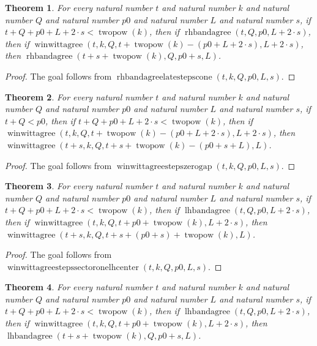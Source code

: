 \documentclass[11pt]{article}
\newtheorem{theorem}{Theorem}[section]
\theoremstyle{definition}
\begin{document}
\begin{theorem}
\label{ll:paper:rhbandagree-late-steps-cone}
For every natural number \(t\) and natural number \(k\) and natural number \(Q\) and natural number \(p0\) and natural number \(L\) and natural number \(s\), if \(t + Q + p0 + L + 2 \cdot s < \operatorname{twopow}(k)\), then if \(\operatorname{rhbandagree}(t, Q, p0, L + 2 \cdot s)\), then if \(\operatorname{winwittagree}(t, k, Q, t + \operatorname{twopow}(k) - (p0 + L + 2 \cdot s), L + 2 \cdot s)\), then \(\operatorname{rhbandagree}(t + s + \operatorname{twopow}(k), Q, p0 + s, L)\).
\end{theorem}
\begin{proof}
The goal follows from \(\operatorname{rhbandagreelatestepscone}(t, k, Q, p0, L, s)\).
\end{proof}
\begin{theorem}
\label{ll:paper:winwittagree-steps-zero-gap}
For every natural number \(t\) and natural number \(k\) and natural number \(Q\) and natural number \(p0\) and natural number \(L\) and natural number \(s\), if \(t + Q < p0\), then if \(t + Q + p0 + L + 2 \cdot s < \operatorname{twopow}(k)\), then if \(\operatorname{winwittagree}(t, k, Q, t + \operatorname{twopow}(k) - (p0 + L + 2 \cdot s), L + 2 \cdot s)\), then \(\operatorname{winwittagree}(t + s, k, Q, t + s + \operatorname{twopow}(k) - (p0 + s + L), L)\).
\end{theorem}
\begin{proof}
The goal follows from \(\operatorname{winwittagreestepszerogap}(t, k, Q, p0, L, s)\).
\end{proof}
\begin{theorem}
\label{ll:paper:winwittagree-steps-sector-one-lhcenter}
For every natural number \(t\) and natural number \(k\) and natural number \(Q\) and natural number \(p0\) and natural number \(L\) and natural number \(s\), if \(t + Q + p0 + L + 2 \cdot s < \operatorname{twopow}(k)\), then if \(\operatorname{lhbandagree}(t, Q, p0, L + 2 \cdot s)\), then if \(\operatorname{winwittagree}(t, k, Q, t + p0 + \operatorname{twopow}(k), L + 2 \cdot s)\), then \(\operatorname{winwittagree}(t + s, k, Q, t + s + (p0 + s) + \operatorname{twopow}(k), L)\).
\end{theorem}
\begin{proof}
The goal follows from \(\operatorname{winwittagreestepssectoronelhcenter}(t, k, Q, p0, L, s)\).
\end{proof}
\begin{theorem}
\label{ll:paper:lhbandagree-late-steps-sector-one}
For every natural number \(t\) and natural number \(k\) and natural number \(Q\) and natural number \(p0\) and natural number \(L\) and natural number \(s\), if \(t + Q + p0 + L + 2 \cdot s < \operatorname{twopow}(k)\), then if \(\operatorname{lhbandagree}(t, Q, p0, L + 2 \cdot s)\), then if \(\operatorname{winwittagree}(t, k, Q, t + p0 + \operatorname{twopow}(k), L + 2 \cdot s)\), then \(\operatorname{lhbandagree}(t + s + \operatorname{twopow}(k), Q, p0 + s, L)\).
\end{theorem}
\end{document}

